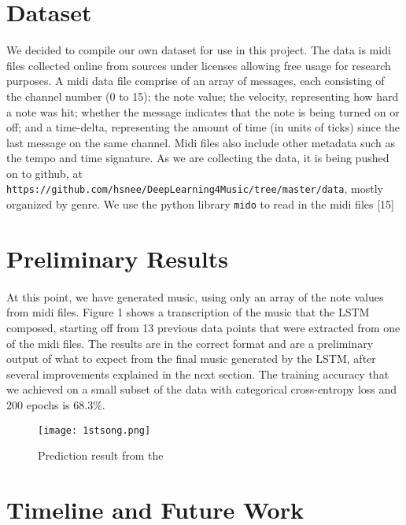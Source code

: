 \documentclass[final]{article}
\begin{document}
\section{Dataset}
We decided to compile our own dataset for use in this project. The data is midi files collected online from sources under licenses allowing free usage for research purposes. A midi data file comprise of an array of messages, each consisting of the channel number (0 to 15); the note value; the velocity, representing how hard a note was hit; whether the message indicates that the note is being turned on or off; and a time-delta, representing the amount of time (in units of ticks) since the last message on the same channel. Midi files also include other metadata such as the tempo and time signature. As we are collecting the data, it is being pushed on to github, at \texttt{https://github.com/hsnee/DeepLearning4Music/tree/master/data}, mostly organized by genre. We use the python library \texttt{mido} to read in the midi files [15]

\section{Preliminary Results}
\paragraph{}At this point, we have generated music, using only an array of the note values from midi files. Figure 1 shows a transcription of the music that the LSTM composed, starting off from 13 previous data points that were extracted from one of the midi files. The results are in the correct format and are a preliminary output of what to expect from the final music generated by the LSTM, after several improvements explained in the next section. The training accuracy that we achieved on a small subset of the data with categorical cross-entropy loss and 200 epochs is 68.3\%. 

\begin{figure}[htbp]
\begin{center}
\texttt{[image: 1stsong.png]}
\caption{Prediction result from the }
\label{default}
\end{center}
\end{figure}


\section{Timeline and Future Work}
\end{document}
